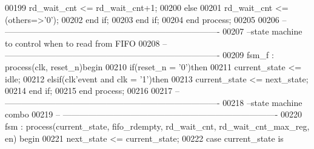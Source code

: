 \begin{DoxyCode}
00199          \textcolor{vhdlchar}{rd_wait_cnt} \textcolor{vhdlchar}{<=} \textcolor{vhdlchar}{rd_wait_cnt}\textcolor{vhdlchar}{+}\textcolor{vhdllogic}{}\textcolor{vhdllogic}{1};
00200       \textcolor{keywordflow}{else}
00201          \textcolor{vhdlchar}{rd_wait_cnt} \textcolor{vhdlchar}{<=} \textcolor{vhdlchar}{(}\textcolor{keywordflow}{others}\textcolor{vhdlchar}{=}\textcolor{vhdlchar}{>}\textcolor{vhdlchar}{'}\textcolor{vhdllogic}{}\textcolor{vhdllogic}{0}\textcolor{vhdlchar}{'}\textcolor{vhdlchar}{)};
00202       \textcolor{keywordflow}{end} \textcolor{keywordflow}{if};
00203    \textcolor{keywordflow}{end} \textcolor{keywordflow}{if};
00204 \textcolor{keywordflow}{end} \textcolor{keywordflow}{process};
00205  
00206 \textcolor{keyword}{-- ----------------------------------------------------------------------------}
00207 \textcolor{keyword}{--state machine to control when to read from FIFO}
00208 \textcolor{keyword}{-- ----------------------------------------------------------------------------}
00209 fsm\_f : \textcolor{keywordflow}{process}(clk, reset_n)\textcolor{keywordflow}{begin}
00210    \textcolor{keywordflow}{if}\textcolor{vhdlchar}{(}\textcolor{vhdlchar}{reset_n} \textcolor{vhdlchar}{=} \textcolor{vhdlchar}{'}\textcolor{vhdllogic}{}\textcolor{vhdllogic}{0}\textcolor{vhdlchar}{'}\textcolor{vhdlchar}{)}\textcolor{keywordflow}{then}
00211       \textcolor{vhdlchar}{current_state} \textcolor{vhdlchar}{<=} \textcolor{vhdlchar}{idle};
00212    \textcolor{keywordflow}{elsif}\textcolor{vhdlchar}{(}\textcolor{vhdlchar}{clk}\textcolor{vhdlchar}{'}\textcolor{vhdlkeyword}{event} \textcolor{keywordflow}{and} \textcolor{vhdlchar}{clk} \textcolor{vhdlchar}{=} \textcolor{vhdlchar}{'}\textcolor{vhdllogic}{}\textcolor{vhdllogic}{1}\textcolor{vhdlchar}{'}\textcolor{vhdlchar}{)}\textcolor{keywordflow}{then} 
00213       \textcolor{vhdlchar}{current_state} \textcolor{vhdlchar}{<=} \textcolor{vhdlchar}{next_state};
00214    \textcolor{keywordflow}{end} \textcolor{keywordflow}{if};
00215 \textcolor{keywordflow}{end} \textcolor{keywordflow}{process};
00216 
00217 \textcolor{keyword}{-- ----------------------------------------------------------------------------}
00218 \textcolor{keyword}{--state machine combo}
00219 \textcolor{keyword}{-- ----------------------------------------------------------------------------}
00220 fsm : \textcolor{keywordflow}{process}(current_state, fifo_rdempty, rd_wait_cnt, rd_wait_cnt_max_reg, en) \textcolor{keywordflow}{begin}
00221    \textcolor{vhdlchar}{next_state} \textcolor{vhdlchar}{<=} \textcolor{vhdlchar}{current_state};
00222    \textcolor{keywordflow}{case} \textcolor{vhdlchar}{current_state} \textcolor{keywordflow}{is}

\end{DoxyCode}
